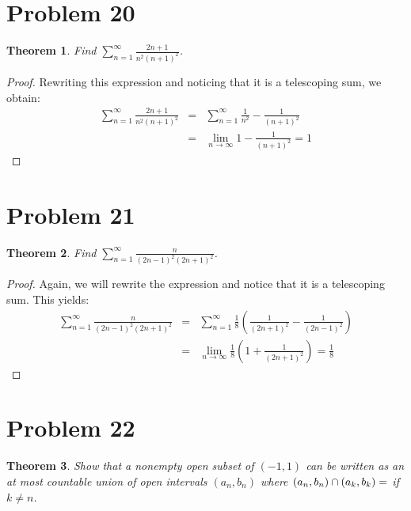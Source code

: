 \documentclass[psamsfonts]{amsart}
\newtheorem{thm}{Theorem}[section]
\theoremstyle{definition}
\theoremstyle{remark}
\numberwithin{equation}{section}
\begin{document}
\section{Problem 20}

\begin{thm}
Find $\sum_{n=1}^\infty \frac{2n+1}{n^2 (n+1)^2}$.
\end{thm}

\begin{proof}
Rewriting this expression and noticing that it is a telescoping sum, we obtain:
\begin{eqnarray}
\sum_{n=1}^\infty \frac{2n+1}{n^2 (n+1)^2} &=& \sum_{n=1}^\infty \frac{1}{n^2} - \frac{1}{(n+1)^2} \\
&=& \lim_{n \to \infty} 1 - \frac{1}{(n+1)^2} = 1
\end{eqnarray}
\end{proof}

\section{Problem 21}

\begin{thm}
Find $\sum_{n=1}^\infty \frac{n}{(2n-1)^2(2n+1)^2}$.
\end{thm}

\begin{proof}
Again, we will rewrite the expression and notice that it is a telescoping sum. This yields:
\begin{eqnarray}
\sum_{n=1}^\infty \frac{n}{(2n-1)^2 (2n+1)^2 } &=& \sum_{n=1}^\infty \frac{1}{8} \left( \frac{1}{(2n+1)^2} - \frac{1}{(2n-1)^2} \right) \\
&=& \lim_{n \to \infty} \frac{1}{8} \left( 1 + \frac{1}{(2n+1)^2} \right) = \frac{1}{8}
\end{eqnarray}
\end{proof}

\section{Problem 22}

\begin{thm}
Show that a nonempty open subset of $(-1,1)$ can be written as an at most countable union of open intervals $(a_n,b_n)$ where $(a_n,b_n) \cap (a_k,b_k) = \empty$ if $k \neq n$.
\end{thm}
\end{document}
